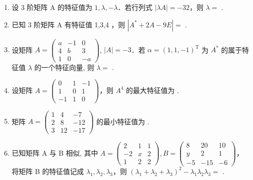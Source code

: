 \documentclass[12pt, a4paper]{ctexart}
\begin{document}
\begin{enumerate}[start=2]
    \item 设 3 阶矩阵 A 的特征值为 $ 1, \lambda, -\lambda $．若行列式 $ \left|\lambda A\right| = -32 $，则 $ \lambda = $ \underline{\hspace{2cm}}.

    \item 已知 3 阶矩阵 A 有特征值 1,3,4 ，则 $ \left|A^{*}+2A-9E\right|= $ \underline{\hspace{2cm}}.

    \item 设矩阵 $ A = \begin{pmatrix} a & -1 & 0 \\ 4 & b & 3 \\ 1 & 0 & -a \end{pmatrix} $, $ |A| = -3 $．若 $ \alpha = (1, 1, -1)^{\mathrm{T}} $ 为 $ A^{*} $ 的属于特征值 $ \lambda $ 的一个特征向量, 则 $ \lambda = $ \underline{\hspace{2cm}}.

    \item 设矩阵 $ A=\begin{pmatrix}0&1&-1\\1&0&1\\-1&1&0\end{pmatrix} $，则 $ A^{4} $ 的最大特征值为 \underline{\hspace{2cm}}.

    \item 矩阵 $ A=\begin{pmatrix}1&4&-7\\2&8&-12\\3&12&-17\end{pmatrix} $ 的最小特征值为 \underline{\hspace{2cm}}.

    \item 已知矩阵 A 与 B 相似, 其中 $ A=\begin{pmatrix}2&1&1\\-2&x&2\\1&2&2\end{pmatrix},B=\begin{pmatrix}8&20&10\\y&2&1\\-5&-15&-6\end{pmatrix} $，将矩阵 B 的特征值记成 $ \lambda_{1},\lambda_{2},\lambda_{3} $，则 $ \left(\lambda_{1}+\lambda_{2}+\lambda_{3}\right)^{2}-\lambda_{1}\lambda_{2}\lambda_{3}= $ \underline{\hspace{2cm}}.


\end{enumerate}
\end{document}
